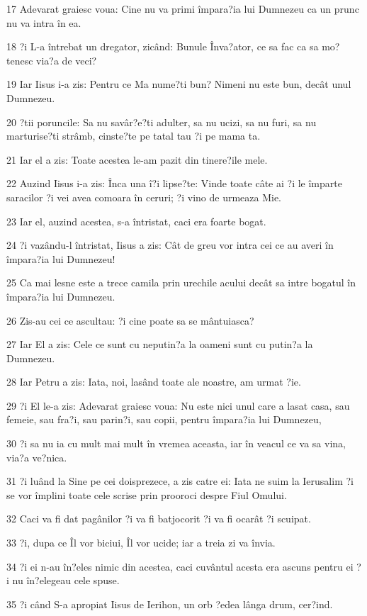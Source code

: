\par 17 Adevarat graiesc voua: Cine nu va primi împara?ia lui Dumnezeu ca un prunc nu va intra în ea.
\par 18 ?i L-a întrebat un dregator, zicând: Bunule Înva?ator, ce sa fac ca sa mo?tenesc via?a de veci?
\par 19 Iar Iisus i-a zis: Pentru ce Ma nume?ti bun? Nimeni nu este bun, decât unul Dumnezeu.
\par 20 ?tii poruncile: Sa nu savâr?e?ti adulter, sa nu ucizi, sa nu furi, sa nu marturise?ti strâmb, cinste?te pe tatal tau ?i pe mama ta.
\par 21 Iar el a zis: Toate acestea le-am pazit din tinere?ile mele.
\par 22 Auzind Iisus i-a zis: Înca una î?i lipse?te: Vinde toate câte ai ?i le împarte saracilor ?i vei avea comoara în ceruri; ?i vino de urmeaza Mie.
\par 23 Iar el, auzind acestea, s-a întristat, caci era foarte bogat.
\par 24 ?i vazându-l întristat, Iisus a zis: Cât de greu vor intra cei ce au averi în împara?ia lui Dumnezeu!
\par 25 Ca mai lesne este a trece camila prin urechile acului decât sa intre bogatul în împara?ia lui Dumnezeu.
\par 26 Zis-au cei ce ascultau: ?i cine poate sa se mântuiasca?
\par 27 Iar El a zis: Cele ce sunt cu neputin?a la oameni sunt cu putin?a la Dumnezeu.
\par 28 Iar Petru a zis: Iata, noi, lasând toate ale noastre, am urmat ?ie.
\par 29 ?i El le-a zis: Adevarat graiesc voua: Nu este nici unul care a lasat casa, sau femeie, sau fra?i, sau parin?i, sau copii, pentru împara?ia lui Dumnezeu,
\par 30 ?i sa nu ia cu mult mai mult în vremea aceasta, iar în veacul ce va sa vina, via?a ve?nica.
\par 31 ?i luând la Sine pe cei doisprezece, a zis catre ei: Iata ne suim la Ierusalim ?i se vor împlini toate cele scrise prin prooroci despre Fiul Omului.
\par 32 Caci va fi dat pagânilor ?i va fi batjocorit ?i va fi ocarât ?i scuipat.
\par 33 ?i, dupa ce Îl vor biciui, Îl vor ucide; iar a treia zi va învia.
\par 34 ?i ei n-au în?eles nimic din acestea, caci cuvântul acesta era ascuns pentru ei ?i nu în?elegeau cele spuse.
\par 35 ?i când S-a apropiat Iisus de Ierihon, un orb ?edea lânga drum, cer?ind.
